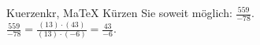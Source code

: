 \begin{MAufgabe}{Kuerzen}{kr, MaTeX}
K\"urzen Sie soweit m\"oglich: $\frac{559}{-78}$.\\ 
\ifLsg\MLoesung
\quad $\frac{559}{-78}=\frac{(13)\cdot(43)}{(13)\cdot(-6)}=\frac{43}{-6}$.\else\relax\fi
 \end{MAufgabe}